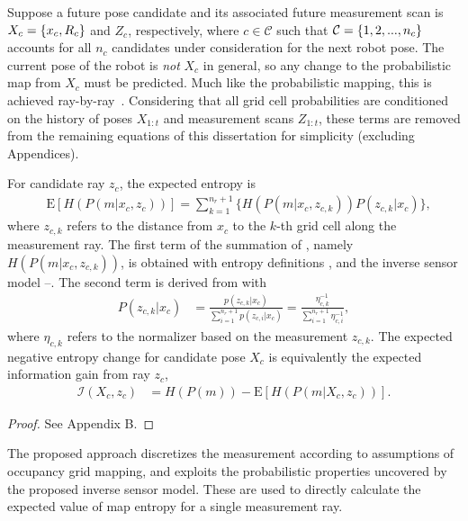 Suppose a future pose candidate and its associated future measurement scan is $X_c=\left\{ x_c,R_c \right\}$ and $Z_c$, respectively, where $c\in\mathcal C$ such that $\mathcal C=\left\{ 1,2,...,n_c \right\}$ accounts for all $n_c$ candidates under consideration for the next robot pose. The current pose of the robot is \emph{not} $X_c$ in general, so any change to the probabilistic map from $X_c$ must be predicted. Much like the probabilistic mapping, this is achieved ray-by-ray~\cite{KauAiLee16,KauTakAiLee17}. Considering that all grid cell probabilities are conditioned on the history of poses $X_{1:t}$ and measurement scans $Z_{1:t}$, these terms are removed from the remaining equations of this dissertation for simplicity (excluding Appendices). 

\begin{prop}
\label{prop:ExpectedH}
For candidate ray $z_c$, the expected entropy is
\begin{align}
\label{eqn:DiscExpEntropyRay}
&\text{E}[H(P(m|x_c,z_{c}))]=\sum_{k=1}^{n_{r}+1}\bigg\{H(P(m|x_c,z_{c,k}))P(z_{c,k}|x_c)\bigg\},
\end{align}
where $z_{c,k}$ refers to the distance from $x_c$ to the $k$-th grid cell along the measurement ray. The first term of the summation of , namely $H(P(m|x_c,z_{c,k}))$, is obtained with entropy definitions ,  and the inverse sensor model --. The second term is derived from  with
\begin{align}
\label{eqn:ProbMeas}
P(z_{c,k}|x_c)&=\frac{p(z_{c,k}|x_c)}{\sum_{i=1}^{n_{r}+1}p(z_{c,i}|x_c)}=\frac{\eta_{c,k}^{-1}}{\sum_{i=1}^{n_{r}+1}\eta_{c,i}^{-1}},
\end{align}
where $\eta_{c,k}$ refers to the normalizer based on the measurement $z_{c,k}$.
The expected negative entropy change for candidate pose $X_c$ is equivalently the expected information gain from ray $z_c$,
\begin{align}
\label{eqn:expectedInfoGainRay}
\mathcal I(X_c,z_c)&=H(P(m))-\text{E}\left[H(P(m|X_c,z_c))\right].
\end{align}
\end{prop}
\begin{proof}%
See Appendix B.
\end{proof}

The proposed approach discretizes the measurement according to assumptions of occupancy grid mapping, and exploits the probabilistic properties uncovered by the proposed inverse sensor model. These are used to directly calculate the expected value of map entropy for a single measurement ray. 





